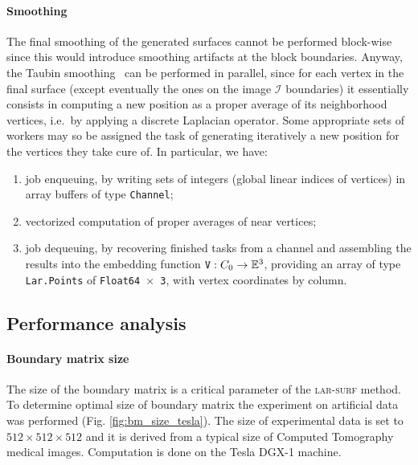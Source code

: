 \paragraph{Smoothing}\label{sec:smoothing}
The final smoothing of the generated surfaces cannot be performed block-wise since this would introduce smoothing artifacts at the block boundaries. Anyway, the Taubin smoothing~\cite{Taubin1995} can be performed in parallel, since for each vertex in the final surface (except eventually the ones on the image $\mathcal{I}$ boundaries) it essentially consists in computing a new position as a proper average of its neighborhood vertices, i.e.~by applying a discrete Laplacian operator.  Some appropriate sets of workers may so be assigned the task of generating iteratively a new position for the vertices they take cure of. In particular, we have:
\begin{enumerate}

\item job enqueuing, by writing sets of integers (global linear indices of vertices) in array buffers of type \texttt{Channel};

\item vectorized computation of proper averages of near vertices;

\item job dequeuing, by recovering finished tasks from a channel and assembling the results into the embedding function $\mathtt{V}: C_0 \to \mathbb{E}^3$, providing an array of type \texttt{Lar.Points} of \texttt{Float64 $\times$ 3}, with vertex coordinates by column.
\end{enumerate}



\subsection{Performance analysis}\label{sec:analysis}

\paragraph{Boundary matrix size}
The size of the boundary matrix is a critical parameter of the \textsc{lar-surf} method. To determine optimal size of boundary matrix the experiment on artificial data was performed (Fig.  \ref{fig:bm_size_tesla}). The size of experimental data is set to $512\times512\times512$ and it is derived from a typical size of Computed Tomography medical images. Computation is done on the Tesla DGX-1 machine.

